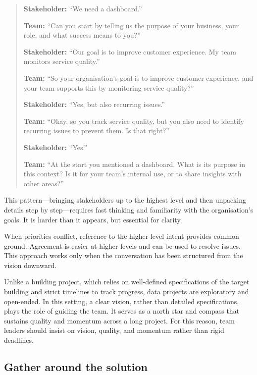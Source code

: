 \documentclass[10pt,openany,10pt]{book}
\begin{document}
\begin{quote}
\textbf{Stakeholder:} ``We need a dashboard.''

\textbf{Team:} ``Can you start by telling us the purpose of your
business, your role, and what success means to you?''

\textbf{Stakeholder:} ``Our goal is to improve customer experience. My
team monitors service quality.''

\textbf{Team:} ``So your organisation's goal is to improve customer
experience, and your team supports this by monitoring service quality?''

\textbf{Stakeholder:} ``Yes, but also recurring issues.''

\textbf{Team:} ``Okay, so you track service quality, but you also need
to identify recurring issues to prevent them. Is that right?''

\textbf{Stakeholder:} ``Yes.''

\textbf{Team:} ``At the start you mentioned a dashboard. What is its
purpose in this context? Is it for your team's internal use, or to share
insights with other areas?''
\end{quote}

This pattern---bringing stakeholders up to the highest level and then
unpacking details step by step---requires fast thinking and familiarity
with the organisation's goals. It is harder than it appears, but
essential for clarity.

When priorities conflict, reference to the higher-level intent provides
common ground. Agreement is easier at higher levels and can be used to
resolve issues. This approach works only when the conversation has been
structured from the vision downward.

Unlike a building project, which relies on well-defined specifications
of the target building and strict timelines to track progress, data
projects are exploratory and open-ended. In this setting, a clear
vision, rather than detailed specifications, plays the role of guiding
the team. It serves as a north star and compass that sustains quality
and momentum across a long project. For this reason, team leaders should
insist on vision, quality, and momentum rather than rigid deadlines.

\subsection{Gather around the
solution}\label{gather-around-the-solution}
\end{document}
